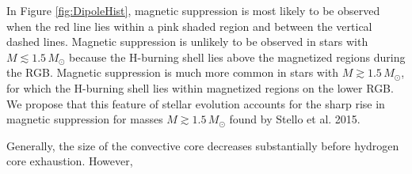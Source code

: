 In Figure \ref{fig:DipoleHist}, magnetic suppression is most likely to be observed when the red line lies within a pink shaded region and between the vertical dashed lines. Magnetic suppression is unlikely to be observed in stars with $M \lesssim 1.5 \, M_\odot$ because the H-burning shell lies above the magnetized regions during the RGB. Magnetic suppression is much more common in stars with $M \gtrsim 1.5 \, M_\odot$, for which the H-burning shell lies within magnetized regions on the lower RGB. We propose that this feature of stellar evolution accounts for the sharp rise in magnetic suppression for masses $M \gtrsim 1.5 \, M_\odot$ found by Stello et al. 2015.



Generally, the size of the convective core decreases substantially before hydrogen core exhaustion. However, 